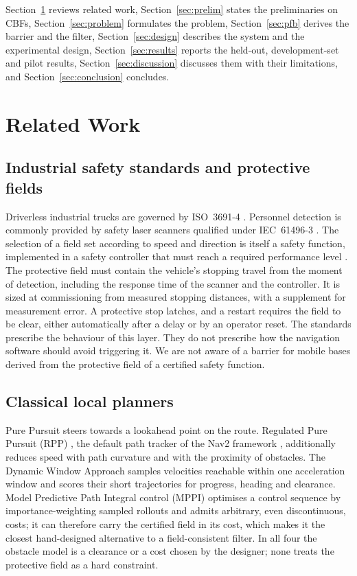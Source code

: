\documentclass[11pt]{article}
\theoremstyle{definition}
\begin{document}
Section~\ref{sec:related} reviews related work, Section~\ref{sec:prelim} states the preliminaries on CBFs,
Section~\ref{sec:problem} formulates the problem,
Section~\ref{sec:pfb} derives the barrier and the filter, Section~\ref{sec:design} describes the system
and the experimental design, Section~\ref{sec:results} reports the held-out, development-set and pilot results,
Section~\ref{sec:discussion} discusses them with their limitations, and Section~\ref{sec:conclusion}
concludes.

\section{Related Work}\label{sec:related}

\subsection{Industrial safety standards and protective fields}
Driverless industrial trucks are governed by ISO~3691-4 \citep{iso3691-4}. Personnel detection is
commonly provided by safety laser scanners qualified under IEC~61496-3 \citep{iec61496-3}. The
selection of a field set according to speed and direction is itself a safety function, implemented in a
safety controller that must reach a required performance level \citep{iso13849-1}. The protective field
must contain the vehicle's stopping travel from the moment of detection, including the response time of
the scanner and the controller. It is sized at commissioning from measured stopping distances, with a
supplement for measurement error. A protective stop latches, and a restart requires the field to be
clear, either automatically after a delay or by an operator reset. The standards prescribe the
behaviour of this layer. They do not prescribe how the navigation software should avoid triggering it.
We are not aware of a barrier for mobile bases derived from the protective field of a certified safety
function.

\subsection{Classical local planners}
Pure Pursuit \citep{coulter1992purepursuit} steers towards a lookahead point on the route. Regulated
Pure Pursuit (RPP) \citep{macenski2023rpp}, the default path tracker of the Nav2 framework
\citep{macenski2020nav2}, additionally reduces speed with path curvature and with the proximity of
obstacles. The Dynamic Window Approach \citep{fox1997dwa} samples velocities reachable within one
acceleration window and scores their short trajectories for progress, heading and clearance. Model
Predictive Path Integral control (MPPI) \citep{williams2017mppi} optimises a control sequence by
importance-weighting sampled rollouts and admits arbitrary, even discontinuous, costs; it can therefore
carry the certified field in its cost, which makes it the closest hand-designed alternative to a field-consistent filter. In all four the obstacle model is a clearance or a cost chosen by the designer;
none treats the protective field as a hard constraint.
\end{document}
